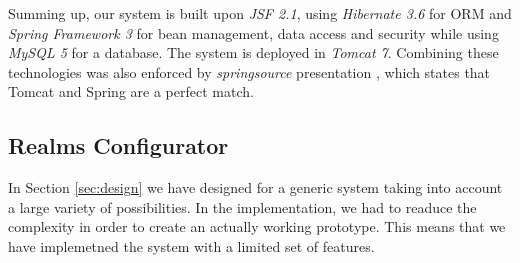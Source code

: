 \noindent Summing up, our system is built upon \emph{JSF 2.1}, using
\emph{Hibernate 3.6} for ORM and \emph{Spring Framework 3} for bean management, data access and
security while using \emph{MySQL 5} for a database. The system is deployed in
\emph{Tomcat 7}. Combining these technologies was also enforced by
\emph{springsource} presentation \cite{tomcat_spring}, which states that Tomcat
and Spring are a perfect match.

\subsection{Realms Configurator}
In Section \ref{sec:design} we have designed for a generic system taking into account a large variety of possibilities. In the implementation, we had to readuce the complexity in order to create an actually working prototype. This means that we have implemetned the system with a limited set of features. 